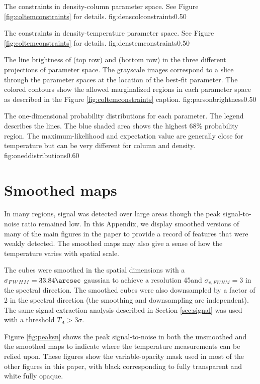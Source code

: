 {The constraints in density-column parameter space.
See Figure \ref{fig:coltemconstraints} for details.}
{fig:denscolconstraints}{0.5}{0}

{The constraints in density-temperature parameter space.
See Figure \ref{fig:coltemconstraints} for details.}
{fig:denstemconstraints}{0.5}{0}

{The line brightness of \para \threeohthree (top row) and \para \threetwoone
(bottom row) in the three different projections of parameter space.  The
grayscale images correspond to a slice through the parameter spaces at the
location of the best-fit parameter.  The colored contours show the allowed
marginalized regions in each parameter space as described in the
Figure \ref{fig:coltemconstraints} caption.}
{fig:parsonbrightness}{0.5}{0}

{The one-dimensional probability distributions for each parameter.  The legend
describes the lines.  The blue shaded area shows the highest 68\% probability
region.  The maximum-likelihood and expectation value are generally
close for temperature but can be very different for column and density.}
{fig:oneddistributions}{0.6}{0}

\section{Smoothed maps}
\label{appendix:smoothed}
In many regions, signal was detected over large areas though the peak
signal-to-noise ratio remained low.  In this Appendix, we display smoothed
versions of many of the main figures in the paper to provide a record of
features that were weakly detected.  The smoothed maps may also give a sense
of how the temperature varies with spatial scale.

The cubes were smoothed in the spatial dimensions with a
$\sigma_{FWHM}=33.84\arcsec$ gaussian to achieve a resolution 45\arcsec and
$\sigma_{v, FWHM} = 3$ \kms in the spectral direction.  The smoothed cubes were
also downsampled by a factor of 2 in the spectral direction (the smoothing and
downsampling are independent).  
The same signal extraction analysis described in Section \ref{sec:signal} was used with a
threshold $T_A > 3\sigma$.  

Figure \ref{fig:peaksn} shows the peak signal-to-noise in both the unsmoothed
and the smoothed maps to indicate where the temperature measurements can be
relied upon.  These figures show the variable-opacity mask used in most of the
other figures in this paper, with black corresponding to fully transparent and
white fully opaque.


